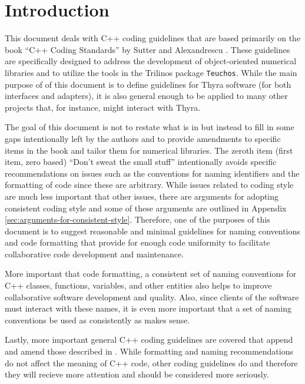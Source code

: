 %
\section{Introduction}
%

This document deals with C++ coding guidelines that are based primarily on the
book ``C++ Coding Standards'' by Sutter and Alexandrescu
{}\cite{C++CodingStandards05}.  These guidelines are specifically designed to
address the development of object-oriented numerical libraries and to utilize
the tools in the Trilinos package {}\texttt{Teuchos}.  While the main purpose
of of this document is to define guidelines for Thyra software (for both
interfaces and adapters), it is also general enough to be applied to many
other projects that, for instance, might interact with Thyra.

The goal of this document is not to restate what is in
{}\cite{C++CodingStandards05} but instead to fill in some gaps intentionally
left by the authors and to provide amendments to specific items in the book
and tailor them for numerical libraries.  The zeroth item (first item, zero
based) ``Don't sweat the small stuff'' intentionally avoids specific
recommendations on issues such as the conventions for naming identifiers and
the formatting of code since these are arbitrary.  While issues related to
coding style are much less important that other issues, there are arguments
for adopting consistent coding style and some of these arguments are outlined
in Appendix {}\ref{sec:arguments-for-consistent-style}.  Therefore, one of the
purposes of this document is to suggest reasonable and minimal guidelines for
naming conventions and code formatting that provide for enough code uniformity
to facilitate collaborative code development and maintenance.

More important that code formatting, a consistent set of naming conventions
for C++ classes, functions, variables, and other entities also helps to
improve collaborative software development and quality.  Also, since clients
of the software must interact with these names, it is even more important that
a set of naming conventions be used as consistently as makes sense.

Lastly, more important general C++ coding guidelines are covered that append
and amend those described in {}\cite{C++CodingStandards05}.  While formatting
and naming recommendations do not affect the meaning of C++ code, other coding
guidelines do and therefore they will recieve more attention and should be
considered more seriously.

